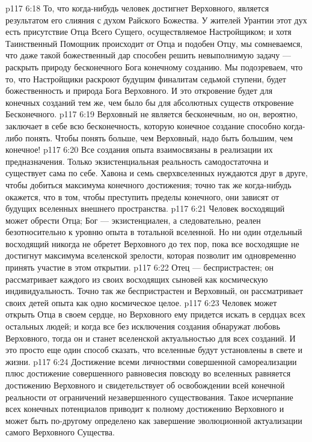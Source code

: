 \vs p117 6:18 То, что когда\hyp{}нибудь человек достигнет Верховного, является результатом его слияния с духом Райского Божества. У жителей Урантии этот дух есть присутствие Отца Всего Сущего, осуществляемое Настройщиком; и хотя Таинственный Помощник происходит от Отца и подобен Отцу, мы сомневаемся, что даже такой божественный дар способен решить невыполнимую задачу --- раскрыть природу бесконечного Бога конечному созданию. Мы подозреваем, что то, что Настройщики раскроют будущим финалитам седьмой ступени, будет божественность и природа Бога Верховного. И это откровение будет для конечных созданий тем же, чем было бы для абсолютных существ откровение Бесконечного.
\vs p117 6:19 Верховный не является бесконечным, но он, вероятно, заключает в себе всю бесконечность, которую конечное создание способно когда\hyp{}либо понять. Чтобы понять больше, чем Верховный, надо быть большим, чем конечное!
\vs p117 6:20 Все создания опыта взаимосвязаны в реализации их предназначения. Только экзистенциальная реальность самодостаточна и существует сама по себе. Хавона и семь сверхвселенных нуждаются друг в друге, чтобы добиться максимума конечного достижения; точно так же когда\hyp{}нибудь окажется, что в том, чтобы преступить пределы конечного, они зависят от будущих вселенных внешнего пространства.
\vs p117 6:21 Человек восходящий может обрести Отца; Бог --- экзистенциален, а следовательно, реален безотносительно к уровню опыта в тотальной вселенной. Но ни один отдельный восходящий никогда не обретет Верховного до тех пор, пока все восходящие не достигнут максимума вселенской зрелости, которая позволит им одновременно принять участие в этом открытии.
\vs p117 6:22 Отец --- беспристрастен; он рассматривает каждого из своих восходящих сыновей как космическую индивидуальность. Точно так же беспристрастен и Верховный, он рассматривает своих детей опыта как одно космическое целое.
\vs p117 6:23 Человек может открыть Отца в своем сердце, но Верховного ему придется искать в сердцах всех остальных людей; и когда все без исключения создания обнаружат любовь Верховного, тогда он и станет вселенской актуальностью для всех созданий. И это просто еще один способ сказать, что вселенные будут установлены в свете и жизни.
\vs p117 6:24 Достижение всеми личностями совершенной самореализации плюс достижение совершенного равновесия повсюду во вселенных равняется достижению Верховного и свидетельствует об освобождении всей конечной реальности от ограничений незавершенного существования. Такое исчерпание всех конечных потенциалов приводит к полному достижению Верховного и может быть по\hyp{}другому определено как завершение эволюционной актуализации самого Верховного Существа.
